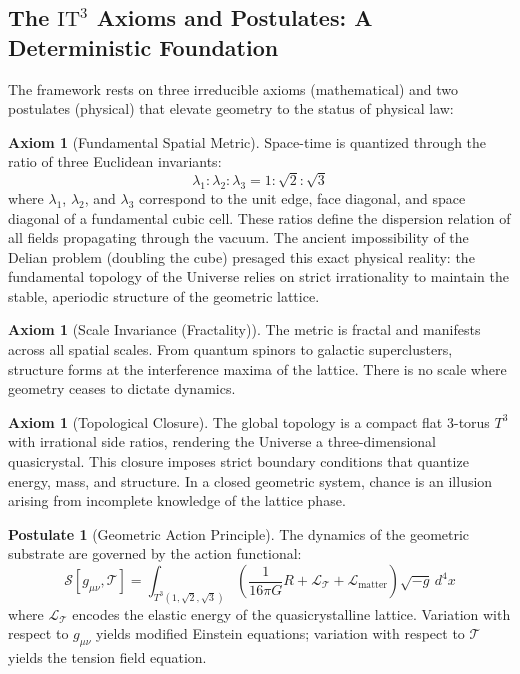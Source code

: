 \documentclass[12pt,a4paper,oneside]{article}
\theoremstyle{plain}
\theoremstyle{definition}
\newtheorem{axiom}[theorem]{Axiom}
\newtheorem{postulate}[theorem]{Postulate}
\theoremstyle{remark}
\newcommand{\ITthree}{\mathrm{IT}^3}
\newcommand{\Tthree}{T^3(1,\sqrt{2},\sqrt{3})}
\newcommand{\tension}{\mathcal{T}}
\newcommand{\Lag}{\mathcal{L}}
\newcommand{\Action}{\mathcal{S}}
\newcommand{\GNewton}{G}
\begin{document}
\subsection{The $\ITthree$ Axioms and Postulates: A Deterministic Foundation}
The framework rests on three irreducible axioms (mathematical) and two postulates (physical) that elevate geometry to the status of physical law:

\begin{axiom}[Fundamental Spatial Metric]
\label{ax:metric}
Space-time is quantized through the ratio of three Euclidean invariants:
\begin{equation}
\boxed{\lambda_1 : \lambda_2 : \lambda_3 = 1 : \sqrt{2} : \sqrt{3}}
\end{equation}
where $\lambda_1$, $\lambda_2$, and $\lambda_3$ correspond to the unit edge, face diagonal, and space diagonal of a fundamental cubic cell. These ratios define the dispersion relation of all fields propagating through the vacuum. The ancient impossibility of the Delian problem (doubling the cube) presaged this exact physical reality: the fundamental topology of the Universe relies on strict irrationality to maintain the stable, aperiodic structure of the geometric lattice.
\end{axiom}

\begin{axiom}[Scale Invariance (Fractality)]
\label{ax:fractal}
The metric is fractal and manifests across all spatial scales. From quantum spinors to galactic superclusters, structure forms at the interference maxima of the lattice. There is no scale where geometry ceases to dictate dynamics.
\end{axiom}

\begin{axiom}[Topological Closure]
\label{ax:torus}
The global topology is a compact flat 3-torus $T^3$ with irrational side ratios, rendering the Universe a three-dimensional quasicrystal. This closure imposes strict boundary conditions that quantize energy, mass, and structure. In a closed geometric system, chance is an illusion arising from incomplete knowledge of the lattice phase.
\end{axiom}

\begin{postulate}[Geometric Action Principle]
\label{post:action}
The dynamics of the geometric substrate are governed by the action functional:
\begin{equation}
\Action[g_{\mu\nu}, \tension] = \int_{\Tthree} \left( \frac{1}{16\pi\GNewton} R + \Lag_{\tension} + \Lag_{\text{matter}} \right) \sqrt{-g} \, d^4x
\end{equation}
where $\Lag_{\tension}$ encodes the elastic energy of the quasicrystalline lattice. Variation with respect to $g_{\mu\nu}$ yields modified Einstein equations; variation with respect to $\tension$ yields the tension field equation.
\end{postulate}
\end{document}
